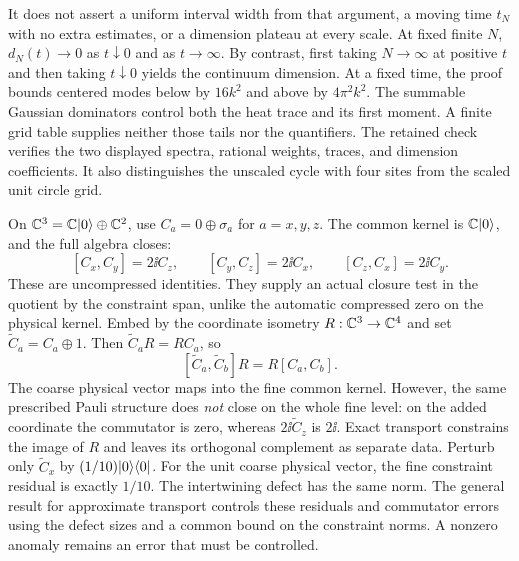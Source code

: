 It does not assert a uniform interval width from that argument, a moving time $t_N$ with no extra estimates, or a dimension plateau at every scale. At fixed finite $N$, $d_N(t)\to0$ as $t\downarrow0$ and as $t\to\infty$. By contrast, first taking $N\to\infty$ at positive $t$ and then taking $t\downarrow0$ yields the continuum dimension.
At a fixed time, the proof bounds centered modes below by $16k^2$ and above by $4\pi^2k^2$. The summable Gaussian dominators control both the heat trace and its first moment. A finite grid table supplies neither those tails nor the quantifiers. The retained check verifies the two displayed spectra, rational weights, traces, and dimension coefficients. It also distinguishes the unscaled cycle with four sites from the scaled unit circle grid.

On $\mathbb C^3=\mathbb C\lvert 0\rangle\oplus\mathbb C^2$, use $C_a=0\oplus\sigma_a$ for $a=x,y,z$. The common kernel is $\mathbb C\lvert 0\rangle$, and the full algebra closes:
\[
[C_x,C_y]=2\ii C_z,\qquad[C_y,C_z]=2\ii C_x,\qquad[C_z,C_x]=2\ii C_y.
\]
These are uncompressed identities. They supply an actual closure test in the quotient by the constraint span, unlike the automatic compressed zero on the physical kernel.
Embed by the coordinate isometry $R:\mathbb C^3\to\mathbb C^4$ and set $\widetilde C_a=C_a\oplus1$. Then $\widetilde C_aR=RC_a$, so
\[
[\widetilde C_a,\widetilde C_b]R=R[C_a,C_b].
\]
The coarse physical vector maps into the fine common kernel. However, the same prescribed Pauli structure does \emph{not} close on the whole fine level: on the added coordinate the commutator is zero, whereas $2\ii\widetilde C_z$ is $2\ii$. Exact transport constrains the image of $R$ and leaves its orthogonal complement as separate data.
Perturb only $\widetilde C_x$ by $(1/10)\lvert 0\rangle\langle 0\rvert$. For the unit coarse physical vector, the fine constraint residual is exactly $1/10$. The intertwining defect has the same norm. The general result for approximate transport controls these residuals and commutator errors using the defect sizes and a common bound on the constraint norms. A nonzero anomaly remains an error that must be controlled.


